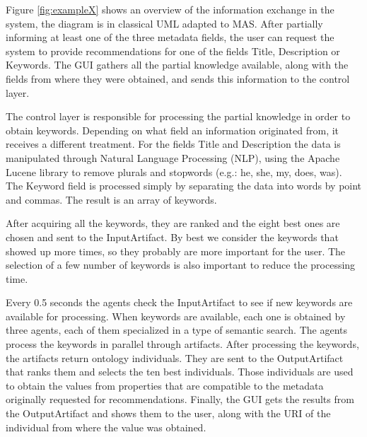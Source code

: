 \documentclass[a4paper,twoside]{article}
\begin{document}
Figure \ref{fig:exampleX} shows an overview of the information exchange in the system, the diagram is in classical UML adapted to MAS. After partially informing at least one of the three metadata fields, the user can request the system to provide recommendations for one of the fields Title, Description or Keywords. The GUI gathers all the partial knowledge available, along with the fields from where they were obtained, and sends this information to the control layer.

\begin{figure*}[!h]
  \centering
   {}
  \caption{Sequence Diagram with an overview of the information exchange in the MAS.}
  \label{fig:exampleX}
 \end{figure*}

The control layer is responsible for processing the partial knowledge in order to obtain keywords. Depending on what field an information originated from, it receives a different treatment. For the fields Title and Description the data is manipulated through Natural Language Processing (NLP), using the Apache Lucene library to remove plurals and stopwords (e.g.: he, she, my, does, was). The Keyword field is processed simply by separating the data into words by point and commas. The result is an array of keywords.

After acquiring all the keywords, they are ranked and the eight best ones are chosen and sent to the InputArtifact. By best we consider the keywords that showed up more times, so they probably are more important for the user. The selection of a few number of keywords is also important to reduce the processing time.

Every 0.5 seconds the agents check the InputArtifact to see if new keywords are available for processing. When keywords are available, each one is obtained by three agents, each of them specialized in a type of semantic search. The agents process the keywords in parallel through artifacts. After processing the keywords, the artifacts return ontology individuals. They are sent to the OutputArtifact that ranks them and selects the ten best individuals. Those individuals are used to obtain the values from properties that are compatible to the metadata originally requested for recommendations. Finally, the GUI gets the results from the OutputArtifact and shows them to the user, along with the URI of the individual from where the value was obtained.
\end{document}
